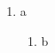 \documentclass{article}
\begin{document}
\begin{enumerate}\item a\begin{enumerate}\item b\end{enumerate}\end{enumerate}
\end{document}
